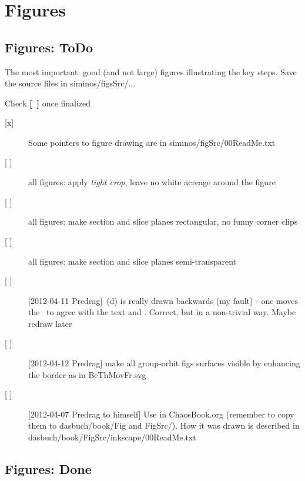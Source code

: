 
\section{Figures}
\label{s:figures}

\subsection{Figures: ToDo}
\label{s:figsToDo}

The most important: good (and not large) figures illustrating the key
steps. Save the source files in siminos/figsSrc/...

Check {\bf [~]} once finalized
\begin{description}

\item[{[x]}] Some pointers to figure drawing are in
             {siminos/figSrc/00ReadMe.txt}
\item[{[ ]}] all figures: apply \emph{tight crop}, leave no white acreage around the figure
\item[{[ ]}] all figures: make section and slice planes rectangular, no funny corner clips
\item[{[ ]}] all figures: make section and slice planes semi-transparent

\item[{[ ]}]  [2012-04-11 Predrag] \,(d) is really
        drawn backwards (my fault) - one moves the \template\ to agree
        with the text and  . Correct, but in a
        non-trivial way. Maybe redraw later

\item[{[ ]}]  [2012-04-12 Predrag] make all group-orbit figs surfaces visible
              by enhancing the border as in BeThMovFr.svg
													
\item[{[ ]}] [2012-04-07 Predrag to himself]                               \toCB
Use  in ChaosBook.org (remember to copy them to
dasbuch/book/Fig and FigSrc/). How it was drawn is described in
dasbuch/book/FigSrc/inkscape/00ReadMe.txt

\end{description}

\subsection{Figures: Done}
\label{s:figsDone}

